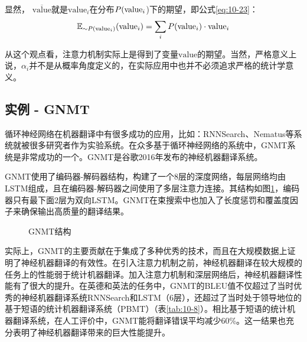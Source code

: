 \noindent 显然， $\overline{\mathrm{value}}$就是$\mathrm{value}_i$在分布$ {P}( \mathrm{value}_i$)下的期望，即公式\eqref{eq:10-23}：
\begin{equation}
\mathbb{E}_{\sim \\ {P} ( {\mathrm{\mathrm{value}}}_i )} ({\mathrm{value}}_i) = \sum_i {P} ({\mathrm{value}}_i) \cdot {\mathrm{value}}_i
\label{eq:10-23}
\end{equation}

从这个观点看，注意力机制实际上是得到了变量$\mathrm{value}$的期望。当然，严格意义上说，$\alpha_i$并不是从概率角度定义的，在实际应用中也并不必须追求严格的统计学意义。

\subsection{实例 - GNMT}
\vspace{0.5em}

\parinterval 循环神经网络在机器翻译中有很多成功的应用，比如：RNNSearch、Nematus等系统就被很多研究者作为实验系统。在众多基于循环神经网络的系统中，GNMT系统是非常成功的一个。GNMT是谷歌2016年发布的神经机器翻译系统。

\parinterval GNMT使用了编码器-解码器结构，构建了一个8层的深度网络，每层网络均由LSTM组成，且在编码器-解码器之间使用了多层注意力连接。其结构如图\ref{fig:10-24}，编码器只有最下面2层为双向LSTM。GNMT在束搜索中也加入了长度惩罚和覆盖度因子来确保输出高质量的翻译结果。
\vspace{0.5em}

\begin{figure}[htp]
\centering

\caption{GNMT结构}
\label{fig:10-24}
\end{figure}

\parinterval 实际上，GNMT的主要贡献在于集成了多种优秀的技术，而且在大规模数据上证明了神经机器翻译的有效性。在引入注意力机制之前，神经机器翻译在较大规模的任务上的性能弱于统计机器翻译。加入注意力机制和深层网络后，神经机器翻译性能有了很大的提升。在英德和英法的任务中，GNMT的BLEU值不仅超过了当时优秀的神经机器翻译系统RNNSearch和LSTM（6层），还超过了当时处于领导地位的基于短语的统计机器翻译系统（PBMT）（表\ref{tab:10-8}）。相比基于短语的统计机器翻译系统，在人工评价中，GNMT能将翻译错误平均减少60\%。这一结果也充分表明了神经机器翻译带来的巨大性能提升。

